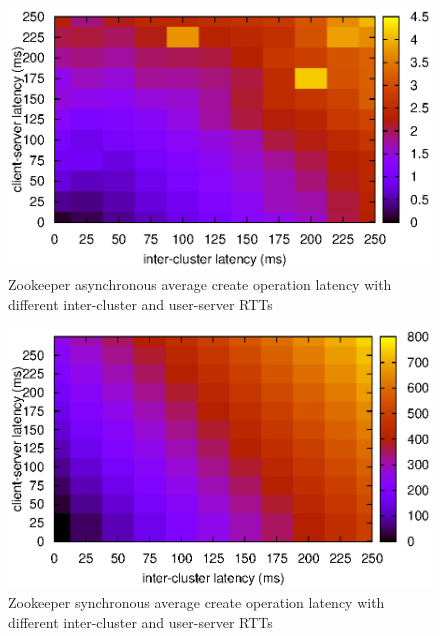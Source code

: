 \begin{figure}[h]
\centering
\includegraphics[scale=0.75]{img/async_ops_latencies_heatmap.eps}
\caption{Zookeeper asynchronous average create operation latency with different inter-cluster and user-server RTTs}
\label{fig:async_heatmap}
\end{figure}

\begin{figure}[h]
\centering
\includegraphics[scale=0.75]{img/sync_ops_latencies_heatmap.eps}
\caption{Zookeeper synchronous average create operation latency with different inter-cluster and user-server RTTs}
\label{fig:sync_heatmap}
\end{figure}


